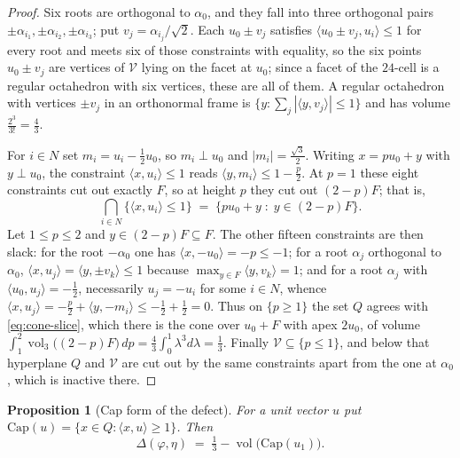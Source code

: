 \documentclass[11pt,reqno]{amsart}
\renewcommand{\_}{\origunderscore\allowbreak}
\numberwithin{equation}{section}
\theoremstyle{plain}
\newtheorem{prop}[thm]{Proposition}
\theoremstyle{definition}
\theoremstyle{remark}
\newcommand{\VCell}{\mathcal{V}}             %
\newcommand{\tilt}{\varphi}                  %
\newcommand{\dev}{\eta}                      %
\newcommand{\defect}{\Delta}                 %
\newcommand{\base}{u}                        %
\newcommand{\capQ}{\mathrm{Cap}}             %
\DeclareMathOperator{\vol}{vol}
\begin{document}
\begin{proof}
Six roots are orthogonal to $\alpha_0$, and they fall into three
orthogonal pairs $\pm\alpha_{i_1},\pm\alpha_{i_2},\pm\alpha_{i_3}$; put
$v_j=\alpha_{i_j}/\sqrt2$. Each $\base_0\pm v_j$ satisfies $\langle
\base_0\pm v_j,\base_i\rangle\le1$ for every root and meets six of those
constraints with equality, so the six points $\base_0\pm v_j$ are
vertices of $\VCell$ lying on the facet at $\base_0$; since a facet of the
$24$-cell is a regular octahedron with six vertices, these are all of
them. A regular octahedron with vertices $\pm v_j$ in an orthonormal frame
is $\{y:\sum_j|\langle y,v_j\rangle|\le1\}$ and has volume
$\tfrac{2^3}{3!}=\tfrac43$.

For $i\in N$ set $m_i=\base_i-\tfrac12\base_0$, so $m_i\perp\base_0$ and
$|m_i|=\tfrac{\sqrt3}{2}$. Writing $x=p\base_0+y$ with $y\perp\base_0$,
the constraint $\langle x,\base_i\rangle\le1$ reads $\langle
y,m_i\rangle\le1-\tfrac p2$. At $p=1$ these eight constraints cut out
exactly $F$, so at height $p$ they cut out $(2-p)F$; that is,
\begin{equation}\label{eq:cone-slice}
  \bigcap_{i\in N}\{\langle x,\base_i\rangle\le1\}
  \;=\;\bigl\{p\base_0+y \;:\; y\in(2-p)F\bigr\}.
\end{equation}
Let $1\le p\le2$ and $y\in(2-p)F\subseteq F$. The other fifteen
constraints are then slack: for the root $-\alpha_0$ one has $\langle
x,-\base_0\rangle=-p\le-1$; for a root $\alpha_j$ orthogonal to $\alpha_0$,
$\langle x,\base_j\rangle=\langle y,\pm v_k\rangle\le1$ because
$\max_{y\in F}\langle y,v_k\rangle=1$; and for a root $\alpha_j$ with
$\langle\base_0,\base_j\rangle=-\tfrac12$, necessarily $\base_j=-\base_i$
for some $i\in N$, whence $\langle x,\base_j\rangle=-\tfrac
p2+\langle y,-m_i\rangle\le-\tfrac12+\tfrac12=0$. Thus on $\{p\ge1\}$ the
set $Q$ agrees with \cref{eq:cone-slice}, which there is the cone over
$\base_0+F$ with apex $2\base_0$, of volume
$\int_1^2\vol_3\bigl((2-p)F\bigr)\,dp=\tfrac43\int_0^1\lambda^3d\lambda
=\tfrac13$. Finally $\VCell\subseteq\{p\le1\}$, and below that hyperplane
$Q$ and $\VCell$ are cut out by the same constraints apart from the one at
$\alpha_0$, which is inactive there.
\end{proof}

\begin{prop}[Cap form of the defect]\label{prop:cap-reformulation}
For a unit vector $u$ put $\capQ(u)=\{x\in Q:\langle x,u\rangle\ge1\}$.
Then
\[
  \defect(\tilt,\dev)\;=\;\tfrac13-\vol\bigl(\capQ(\base_1)\bigr).
\]
\end{prop}
\end{document}
